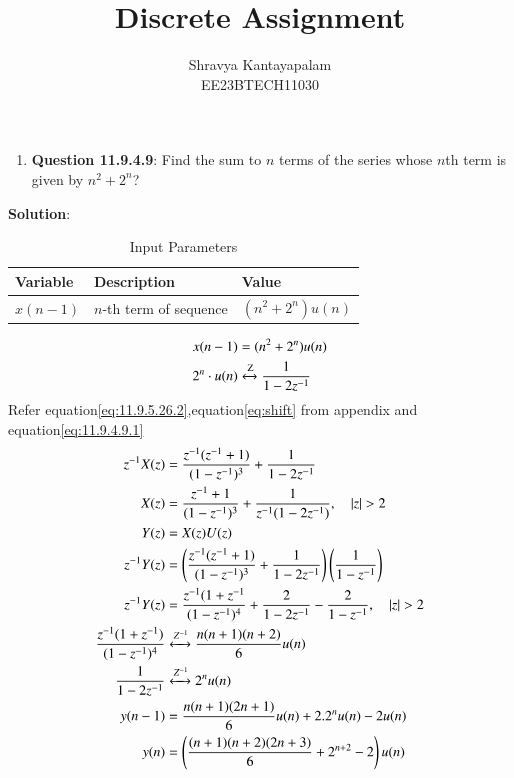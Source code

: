\documentclass[a4,12pt,onecolumn]{IEEEtran}
\begin{document}
\title{Discrete Assignment}
\author{Shravya Kantayapalam\\ EE23BTECH11030}
\maketitle

\begin{enumerate}
    \item \textbf{Question 11.9.4.9}:
    Find the sum to $n$ terms of the series whose $n$th term is given by $n^2 + 2^n$?
 \end{enumerate}  
    \textbf{Solution}:
   

\begin{table}[htbp]
    \centering
    \caption{Input Parameters}
    \begin{tabular}{|l|l|l|}
    \hline
    \textbf{Variable} & \textbf{Description} & \textbf{Value} \\
    \hline
    \( x(n-1) \) & \( n \)-th term of sequence & \( (n^2 + 2^n)u(n) \) \\
    \hline
    \end{tabular}
\end{table}
\begin{align}
x(n-1)&=(n^2+2^n)u(n)\\
2^n \cdot u(n) &\xleftrightarrow{\text{Z}} \frac{1}{1 - 2z^{-1}} \label{eq:11.9.4.9.1}\\
\end{align}
Refer equation\eqref{eq:11.9.5.26.2},equation\eqref{eq:shift} from appendix and equation\eqref{eq:11.9.4.9.1}
\begin{align}
z^{-1}X(z)&=\frac{z^{-1}(z^{-1} + 1)}{(1-z^{-1})^3} +\frac{1}{1 - 2z^{-1}}\\
X(z)&=\frac{z^{-1} + 1}{(1 - z^{-1})^3}+\frac{1}{z^{-1}(1 - 2z^{-1})},\quad{|z|>2}\\
Y(z)&=X(z)U(z)\\
z^{-1}Y(z)&=\brak{\frac{z^{-1}(z^{-1} + 1)}{(1 - z^{-1})^3} +\frac{1}{1 - 2z^{-1}}}\brak{\frac{1}{1-z^{-1}}}\\
z^{-1}Y(z)&=\frac{z^{-1}(1+z^{-1}}{(1-z^{-1})^4}+\frac{2}{1-2z^{-1}}-\frac{2}{1-z^{-1}},\quad{|z|>2}\\
\frac{z^{-1}(1+z^{-1})}{(1-z^{-1})^4}&\xleftrightarrow{Z^{-1}} \frac{n(n+1)(n+2)}{6}u(n)\\
\frac{1}{1-2z^{-1}}&\xleftrightarrow{Z^{-1}} 2^nu(n)\\
y(n-1)&=\frac{n(n+1)(2n+1)}{6}u(n)+2.2^nu(n)-2u(n)\\
y(n)&=\brak{\frac{(n+1)(n+2)(2n+3)}{6}+2^{n+2}-2}u(n)
\end{align}
\end{document}
